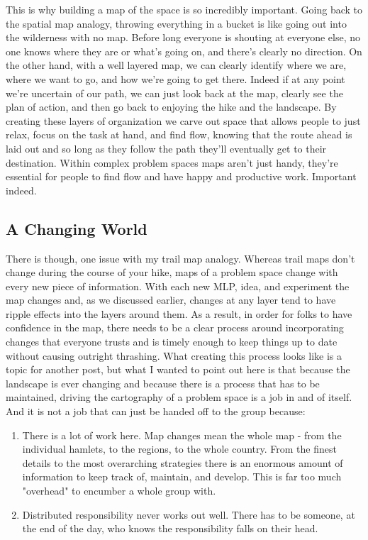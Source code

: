 \documentclass[10pt,a5paper]{book}
\begin{document}
This is why building a map of the space is so incredibly important. Going back to the spatial map analogy, throwing everything in a bucket is like going out into the wilderness with no map. Before long everyone is shouting at everyone else, no one knows where they are or what's going on, and there's clearly no direction. On the other hand, with a well layered map, we can clearly identify where we are, where we want to go, and how we're going to get there. Indeed if at any point we're uncertain of our path, we can just look back at the map, clearly see the plan of action, and then go back to enjoying the hike and the landscape. By creating these layers of organization we carve out space that allows people to just relax, focus on the task at hand, and find flow, knowing that the route ahead is laid out and so long as they follow the path they'll eventually get to their destination. Within complex problem spaces maps aren't just handy, they're essential for people to find flow and have happy and productive work. Important indeed.

\subsection{A Changing World}
There is though, one issue with my trail map analogy. Whereas trail maps don't change during the course of your hike, maps of a problem space change with every new piece of information. With each new MLP, idea, and experiment the map changes and, as we discussed earlier, changes at any layer tend to have ripple effects into the layers around them. As a result, in order for folks to have confidence in the map, there needs to be a clear process around incorporating changes that everyone trusts and is timely enough to keep things up to date without causing outright thrashing. What creating this process looks like is a topic for another post, but what I wanted to point out here is that because the landscape is ever changing and because there is a process that has to be maintained, driving the cartography of a problem space is a job in and of itself. And it is not a job that can just be handed off to the group because: 

\begin{enumerate}
\item There is a lot of work here. Map changes mean the whole map - from the individual hamlets, to the regions, to the whole country. From the finest details to the most overarching strategies there is an enormous amount of information to keep track of, maintain, and develop. This is far too much "overhead" to encumber a whole group with.
\item Distributed responsibility never works out well. There has to be someone, at the end of the day, who knows the responsibility falls on their head.
\end{enumerate}
\end{document}

